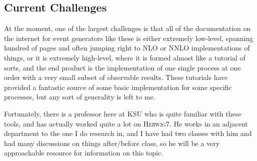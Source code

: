 \subsection{Current Challenges}

At the moment, one of the largest challenges is that all of the documentation on the internet for event generators like these is either extremely low-level, spanning hundred of pages and often jumping right to NLO or NNLO implementations of things, or it is extremely high-level, where it is formed almost like a tutorial of sorts, and the end product is the implementation of one single process at one order with a very small subset of observable results. These tutorials have provided a fantastic source of some basic implementation for some specific processes, but any sort of generality is left to me.

Fortunately, there is a professor here at KSU who is quite familiar with these tools, and has actually worked quite a lot on \textsc{Herwig7}. He works in an adjacent department to the one I do research in, and I have had two classes with him and had many discussions on things after/before class, so he will be a very approachable resource for information on this topic.




